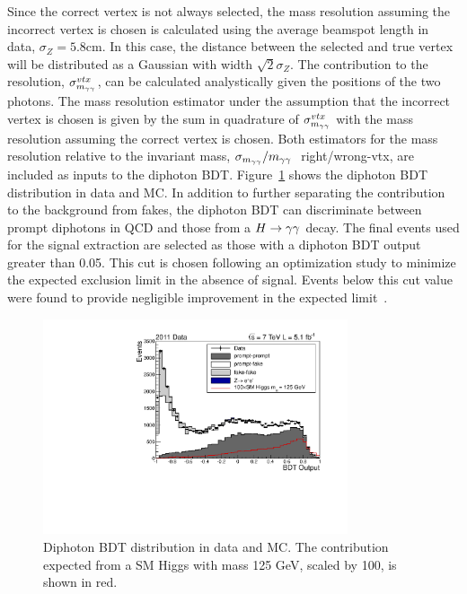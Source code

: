 Since the correct vertex is not always selected, the mass resolution assuming the incorrect vertex is chosen
is calculated using the average beamspot length in data, $\sigma_{Z}=5.8$cm. In this case, the distance 
between the selected and true vertex will be distributed as a Gaussian with width $\sqrt{2}\sigma_{Z}$.
The contribution to the resolution, $\sigma_{m_{\gamma\gamma}}^{vtx}$, can be calculated analystically given the positions of
the two photons. The mass resolution estimator under the assumption that the incorrect vertex is chosen is 
given by the sum in quadrature of $\sigma_{m_{\gamma\gamma}}^{vtx}$ with the mass resolution assuming the correct vertex is chosen.
Both estimators for the mass resolution relative to the invariant mass, $\sigma_{m_{\gamma\gamma}}/m_{\gamma\gamma}~$ right/wrong-vtx, 
are included as inputs to the diphoton BDT. Figure~\ref{fig:diphotonBDT} shows the diphoton BDT distribution in 
data and MC. In addition to further separating the contribution to the background from fakes, the diphoton BDT 
can discriminate between prompt diphotons in QCD and those from a $H\rightarrow\gamma\gamma$ decay. The final events used for 
the signal extraction are selected as those with a diphoton BDT output greater than 0.05. This cut is chosen
following an optimization study to minimize the expected exclusion limit in the absence of signal.
Events below this cut value were found to provide negligible improvement in the expected limit~\cite{AN-12-048}.

\begin{figure}[hbt!]
\begin{center}
 \includegraphics[width=0.8\textwidth]{hgg7TeV/variablePlots/bdtoutput}
 \caption{Diphoton BDT distribution in data and MC. The contribution expected from a SM Higgs with mass 125 GeV, 
 scaled by 100, is shown in red. }
 \label{fig:diphotonBDT}
\end{center}
\end{figure}

